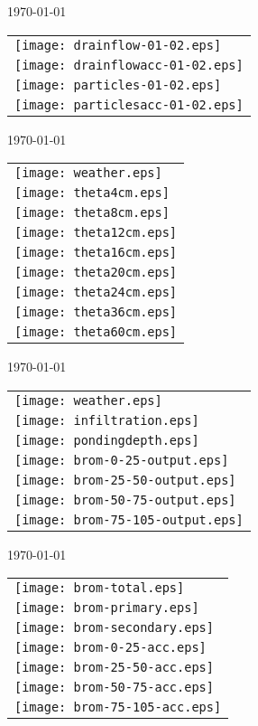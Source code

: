 \documentclass[a4paper]{article}
\begin{document}
\newpage
\today \\
%
\begin{tabular}{l}
\texttt{[image: drainflow-01-02.eps]} \\
\texttt{[image: drainflowacc-01-02.eps]} \\
\texttt{[image: particles-01-02.eps]} \\
\texttt{[image: particlesacc-01-02.eps]}
\end{tabular}

\newpage
\today \\
%
\begin{tabular}{l}
\texttt{[image: weather.eps]} \\
\texttt{[image: theta4cm.eps]} \\
\texttt{[image: theta8cm.eps]} \\
\texttt{[image: theta12cm.eps]} \\
\texttt{[image: theta16cm.eps]} \\
\texttt{[image: theta20cm.eps]} \\
\texttt{[image: theta24cm.eps]} \\
\texttt{[image: theta36cm.eps]} \\
\texttt{[image: theta60cm.eps]}
\end{tabular}

\newpage
\today \\
%
\begin{tabular}{l}
\texttt{[image: weather.eps]} \\
\texttt{[image: infiltration.eps]}\\
\texttt{[image: pondingdepth.eps]}\\
\texttt{[image: brom-0-25-output.eps]} \\
\texttt{[image: brom-25-50-output.eps]} \\
\texttt{[image: brom-50-75-output.eps]} \\
\texttt{[image: brom-75-105-output.eps]}
\end{tabular}

\newpage
\today \\
%
\begin{tabular}{l}
\texttt{[image: brom-total.eps]} \\
\texttt{[image: brom-primary.eps]} \\
\texttt{[image: brom-secondary.eps]} \\
\texttt{[image: brom-0-25-acc.eps]} \\
\texttt{[image: brom-25-50-acc.eps]} \\
\texttt{[image: brom-50-75-acc.eps]} \\
\texttt{[image: brom-75-105-acc.eps]}
\end{tabular}
\end{document}
